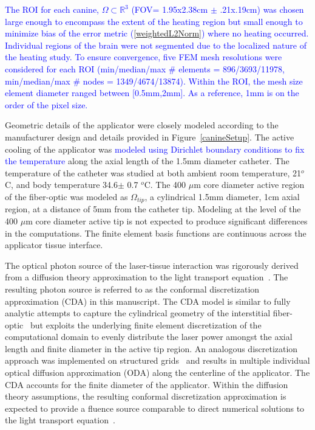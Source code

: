 \documentclass{article}
\newcommand{\eqn}[1]{(\ref{#1})}
\begin{document}
\textcolor{blue}{ %
The ROI for each canine, $\Omega \subset \mathbb{R}^3$ (FOV=
1.95x2.38cm $\pm$ .21x.19cm) 
was chosen large enough to encompass the
extent of the heating region but small enough to minimize bias of
the error metric \eqn{weightedL2Norm} where no  heating occurred.
Individual regions of the brain were not segmented due to the
localized nature of the heating study.
To ensure convergence, five FEM mesh resolutions were considered for
each ROI (min/median/max \# elements = 896/3693/11978, 
          min/median/max \# nodes    = 1349/4674/13874).
Within the ROI, the mesh size element diameter ranged between
[0.5mm,2mm]. As a reference, 1mm is on the order of the pixel size.
}


Geometric details of the applicator were closely modeled according
to the manufacturer design and details provided in
Figure~\ref{canineSetup}.  The active cooling of the applicator was
\textcolor{blue}{ %
modeled using Dirichlet boundary conditions to fix the temperature
}
along the axial length of the 1.5mm diameter catheter.  The
temperature of the catheter was studied at both ambient room
temperature, 21$^o$C, and body temperature 34.6$\pm$ 0.7 $^o$C.
The 400 $\mu$m core diameter active region of the fiber-optic was
modeled as $\Omega_{tip}$, a cylindrical 1.5mm diameter, 1cm axial
region, at a distance of 5mm from the catheter tip. Modeling at the
level of the 400 $\mu$m core diameter active tip is not expected to
produce significant differences in the computations.  The finite
element basis functions are continuous across the applicator tissue
interface.  

The optical photon source of the laser-tissue interaction was
rigorously derived from a diffusion theory approximation to the
light transport equation~\cite{Welch95}.  The resulting photon
source is referred to as the conformal discretization approximation
(CDA) in this manuscript.  The CDA model is similar to fully
analytic attempts to capture the cylindrical geometry of the
interstitial fiber-optic~\cite{Dickey04} but exploits the
underlying finite element discretization of the computational
domain to evenly distribute the laser power amongst the axial
length and finite diameter in the active tip region.  An analogous
discretization approach was implemented on structured
grids~\cite{arnfield1989optical} and results in multiple individual
optical diffusion approximation (ODA) along the centerline of the
applicator.  The CDA accounts for the finite diameter of the
applicator.  Within the diffusion theory assumptions, the resulting
conformal discretization approximation is expected to provide a
fluence source comparable to direct numerical solutions to the
light transport equation~\cite{Mohammed05,shafirstein2004}.
\end{document}
